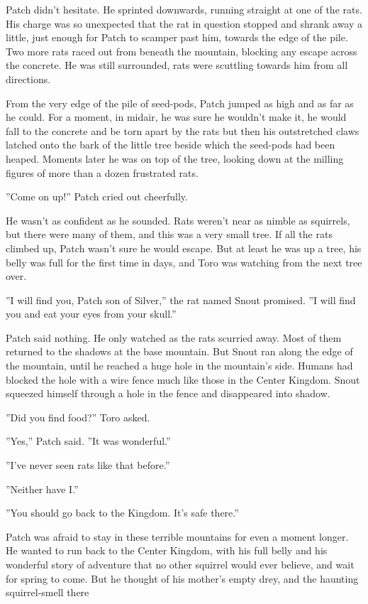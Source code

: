 \documentclass[11pt]{article}
\begin{document}
 Patch didn't hesitate. He sprinted downwards, running straight at one of the rats. His charge was so unexpected that the rat in question stopped and shrank away a little, just enough for Patch to scamper past him, towards the edge of the pile. Two more rats raced out from beneath the mountain, blocking any escape across the concrete. He was still surrounded, rats were scuttling towards him from all directions.\par
From the very edge of the pile of seed-pods, Patch jumped as high and as far as he could. For a moment, in midair, he was sure he wouldn't make it, he would fall to the concrete and be torn apart by the rats %
 but then his outstretched claws latched onto the bark of the little tree beside which the seed-pods had been heaped. Moments later he was on top of the tree, looking down at the milling figures of more than a dozen frustrated rats.\par
 ''Come on up!'' Patch cried out cheerfully.\par
 He wasn't as confident as he sounded. Rats weren't near as nimble as squirrels, but there were many of them, and this was a very small tree. If all the rats climbed up, Patch wasn't sure he would escape. But at least he was up a tree, his belly was full for the first time in days, and Toro was watching from the next tree over.\par
 ''I will find you, Patch son of Silver,'' the rat named Snout promised. ''I will find you and eat your eyes from your skull.''\par
 Patch said nothing. He only watched as the rats scurried away. Most of them returned to the shadows at the base mountain. But Snout ran along the edge of the mountain, until he reached a huge hole in the mountain's side. Humans had blocked the hole with a wire fence much like those in the Center Kingdom. Snout squeezed himself through a hole in the fence and disappeared into shadow.\par
 ''Did you find food?'' Toro asked.\par
 ''Yes,'' Patch said. ''It was wonderful.''\par
 ''I've never seen rats like that before.''\par
 ''Neither have I.''\par
 ''You should go back to the Kingdom. It's safe there.''\par
 Patch was afraid to stay in these terrible mountains for even a moment longer. He wanted to run back to the Center Kingdom, with his full belly and his wonderful story of adventure that no other squirrel would ever believe, and wait for spring to come. But he thought of his mother's empty drey, and the haunting squirrel-smell there %
\end{document}
